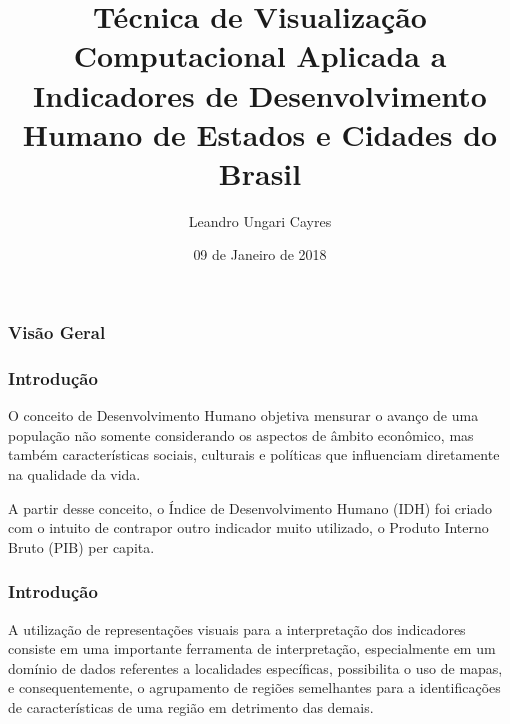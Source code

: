 \documentclass[aspectratio=169]{beamer}
\title[Projeto de Visualização]{Técnica de Visualização Computacional Aplicada a Indicadores de Desenvolvimento Humano de Estados e Cidades do Brasil}
\author[Leandro Ungari Cayres]{Leandro Ungari Cayres} %
\institute[UNESP] %
{
Universidade Estadual Paulista \\ %
\medskip
\textit{leandroungari@gmail.com} %
}
\date{09 de Janeiro de 2018} %
\begin{document}
\begin{frame}
\titlepage %
\end{frame}

\begin{frame}
\frametitle{Visão Geral}
\tableofcontents
\end{frame}

\begin{frame}
\frametitle{Introdução}
\justifying

O conceito de Desenvolvimento Humano objetiva mensurar o avanço de uma população não somente considerando os aspectos de âmbito econômico, mas também características sociais, culturais e políticas que influenciam diretamente na
qualidade da vida. 

A partir desse conceito, o Índice de Desenvolvimento Humano (IDH) foi criado com o intuito de contrapor outro indicador muito utilizado, o Produto Interno Bruto (PIB) per capita.



\end{frame}

\begin{frame}
\frametitle{Introdução}
\justifying

A utilização de representações visuais para a interpretação dos indicadores consiste em uma importante ferramenta de
interpretação, especialmente em um domínio de dados referentes a localidades específicas, possibilita o uso de mapas, e consequentemente, o agrupamento de regiões semelhantes para a identificações de características de uma região em detrimento das demais.

\end{frame}


\end{document}
